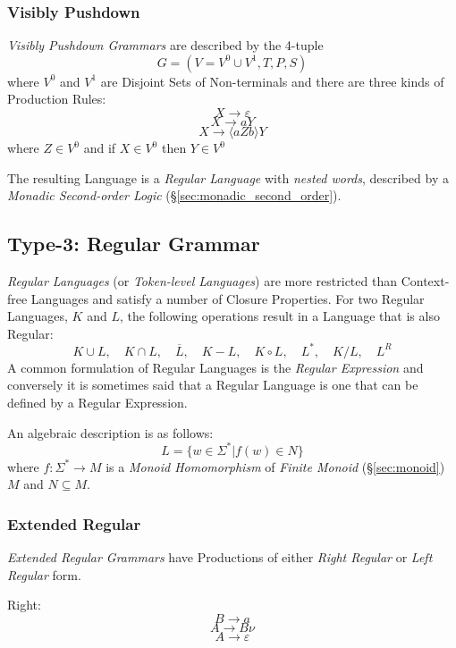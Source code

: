 \subsubsection{Visibly Pushdown}
\emph{Visibly Pushdown Grammars} are described by the 4-tuple
\[
    G = (V=V^0 \cup V^1,T,P,S)
\]
where $V^0$ and $V^1$ are Disjoint Sets of Non-terminals and there
are three kinds of Production Rules:
\[
    X \rightarrow \varepsilon
\]\[
    X \rightarrow aY
\]\[
    X \rightarrow \langle aZb \rangle Y
\]
where $Z \in V^0$ and if $X \in V^0$ then $Y \in V^0$

The resulting Language is a \emph{Regular Language} with \emph{nested
  words}, described by a \emph{Monadic Second-order Logic}
(\S\ref{sec:monadic_second_order}).



\subsection{Type-3: Regular Grammar} \label{sec:regular_language}

\emph{Regular Languages} (or \emph{Token-level Languages}) are more
restricted than Context-free Languages and satisfy a number of Closure
Properties. For two Regular Languages, $K$ and $L$, the following
operations result in a Language that is also Regular:
\[
    K \cup L, \quad
    K \cap L, \quad
    \overline{L}, \quad
    K - L, \quad
    K \circ L, \quad
    L^*, \quad
    K / L, \quad
    L^R
\]
A common formulation of Regular Languages is the \emph{Regular
  Expression} and conversely it is sometimes said that a Regular
Language is one that can be defined by a Regular Expression.

An algebraic description is as follows:
\[
    L = \{ w \in \Sigma^* | f(w) \in N \}
\]
where $f : \Sigma^* \rightarrow M$ is a \emph{Monoid Homomorphism} of
\emph{Finite Monoid} (\S\ref{sec:monoid}) $M$ and $N \subseteq M$.



\subsubsection{Extended Regular}\label{sec:extended_regular}
\emph{Extended Regular Grammars} have Productions of either \emph{Right
Regular} or \emph{Left Regular} form.

Right:
\[
    B \rightarrow a
\]\[
    A \rightarrow B \nu
\]\[
    A \rightarrow \varepsilon
\]

